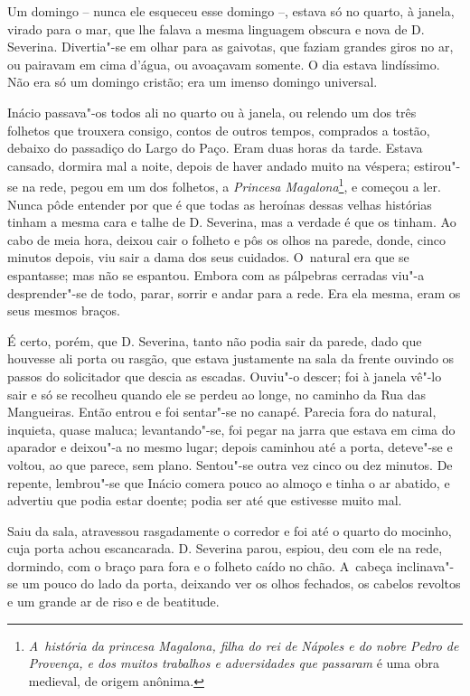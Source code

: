 Um domingo -- nunca ele esqueceu esse domingo --, estava só no quarto, à
janela, virado para o mar, que lhe falava a mesma linguagem obscura e
nova de D. Severina. Divertia"-se em olhar para as gaivotas, que faziam
grandes giros no ar, ou pairavam em cima d'água, ou avoaçavam somente. O
dia estava lindíssimo. Não era só um domingo cristão; era um imenso
domingo universal.

Inácio passava"-os todos ali no quarto ou à janela, ou relendo um dos
três folhetos que trouxera consigo, contos de outros tempos, comprados a
tostão, debaixo do passadiço do Largo do Paço. Eram duas horas da tarde.
Estava cansado, dormira mal a noite, depois de haver andado muito na
véspera; estirou"-se na rede, pegou em um dos folhetos, a \emph{Princesa
Magalona}\footnote{\emph{A~história da princesa Magalona, filha do rei
  de Nápoles e do nobre Pedro de Provença, e dos muitos trabalhos e
  adversidades que passaram} é uma obra medieval, de origem anônima.}, e
começou a ler. Nunca pôde entender por que é que todas as heroínas
dessas velhas histórias tinham a mesma cara e talhe de D. Severina, mas
a verdade é que os tinham. Ao cabo de meia hora, deixou cair o folheto e
pôs os olhos na parede, donde, cinco minutos depois, viu sair a dama dos
seus cuidados. O~natural era que se espantasse; mas não se espantou.
Embora com as pálpebras cerradas viu"-a desprender"-se de todo, parar,
sorrir e andar para a rede. Era ela mesma, eram os seus mesmos braços.

É certo, porém, que D. Severina, tanto não podia sair da parede, dado
que houvesse ali porta ou rasgão, que estava justamente na sala da
frente ouvindo os passos do solicitador que descia as escadas. Ouviu"-o
descer; foi à janela vê"-lo sair e só se recolheu quando ele se perdeu ao
longe, no caminho da Rua das Mangueiras. Então entrou e foi sentar"-se no
canapé. Parecia fora do natural, inquieta, quase maluca; levantando"-se,
foi pegar na jarra que estava em cima do aparador e deixou"-a no mesmo
lugar; depois caminhou até a porta, deteve"-se e voltou, ao que parece,
sem plano. Sentou"-se outra vez cinco ou dez minutos. De repente,
lembrou"-se que Inácio comera pouco ao almoço e tinha o ar abatido, e
advertiu que podia estar doente; podia ser até que estivesse muito mal.

Saiu da sala, atravessou rasgadamente o corredor e foi até o quarto do
mocinho, cuja porta achou escancarada. D. Severina parou, espiou, deu
com ele na rede, dormindo, com o braço para fora e o folheto caído no
chão. A~cabeça inclinava"-se um pouco do lado da porta, deixando ver os
olhos fechados, os cabelos revoltos e um grande ar de riso e de
beatitude.

